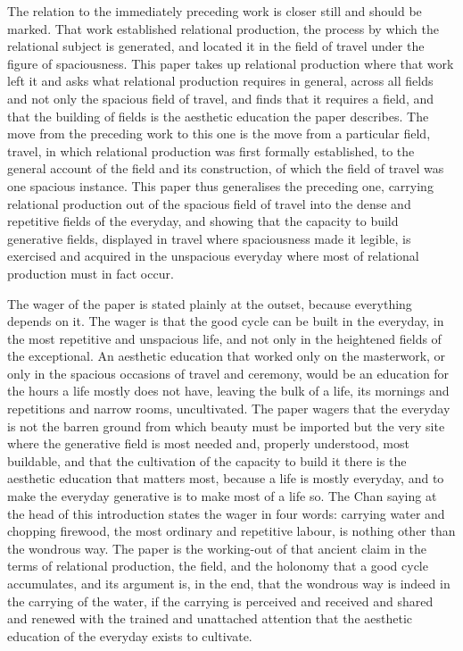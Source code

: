 The relation to the immediately preceding work is closer still and should be marked. That work established relational production, the process by which the relational subject is generated, and located it in the field of travel under the figure of spaciousness. This paper takes up relational production where that work left it and asks what relational production requires in general, across all fields and not only the spacious field of travel, and finds that it requires a field, and that the building of fields is the aesthetic education the paper describes. The move from the preceding work to this one is the move from a particular field, travel, in which relational production was first formally established, to the general account of the field and its construction, of which the field of travel was one spacious instance. This paper thus generalises the preceding one, carrying relational production out of the spacious field of travel into the dense and repetitive fields of the everyday, and showing that the capacity to build generative fields, displayed in travel where spaciousness made it legible, is exercised and acquired in the unspacious everyday where most of relational production must in fact occur.

\medskip\noindent

The wager of the paper is stated plainly at the outset, because everything depends on it. The wager is that the good cycle can be built in the everyday, in the most repetitive and unspacious life, and not only in the heightened fields of the exceptional. An aesthetic education that worked only on the masterwork, or only in the spacious occasions of travel and ceremony, would be an education for the hours a life mostly does not have, leaving the bulk of a life, its mornings and repetitions and narrow rooms, uncultivated. The paper wagers that the everyday is not the barren ground from which beauty must be imported but the very site where the generative field is most needed and, properly understood, most buildable, and that the cultivation of the capacity to build it there is the aesthetic education that matters most, because a life is mostly everyday, and to make the everyday generative is to make most of a life so. The Chan saying at the head of this introduction states the wager in four words: carrying water and chopping firewood, the most ordinary and repetitive labour, is nothing other than the wondrous way. The paper is the working-out of that ancient claim in the terms of relational production, the field, and the holonomy that a good cycle accumulates, and its argument is, in the end, that the wondrous way is indeed in the carrying of the water, if the carrying is perceived and received and shared and renewed with the trained and unattached attention that the aesthetic education of the everyday exists to cultivate.
